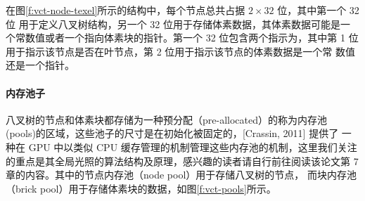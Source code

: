 在图\ref{f:vct-node-texel}所示的结构中，每个节点总共占据 $2\times 32$ 位，其中第一个 32 位 用于定义八叉树结构，另一个 32 位用于存储体素数据，其体素数据可能是一 个常数值或者一个指向体素块的指针。第一个 32 位包含两个指示为，其中第 1 位用于指示该节点是否在叶节点，第 2 位用于指示该节点的体素数据是一个常 数值还是一个指针。



\paragraph{内存池子}
八叉树的节点和体素块都存储为一种预分配（pre-allocated）的称为内存池 (pools)的区域，这些池子的尺寸是在初始化被固定的，\cite{a:Gigavoxels:Avoxelbasedrenderingpipelineforefficientexplorationoflargeanddetailedscenes}[Crassin, 2011] 提供了 一种在 GPU 中以类似 CPU 缓存管理的机制管理这些内存池的机制，这里我们关注的重点是其全局光照的算法结构及原理，感兴趣的读者请自行前往阅读该论文第 7 章的内容。其中的节点内存池（node pool）用于存储八叉树的节点， 而块内存池（brick pool）用于存储体素块的数据，如图\ref{f:vct-pools}所示。

